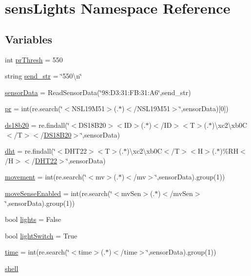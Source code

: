 \hypertarget{namespacesensLights}{}\section{sens\+Lights Namespace Reference}
\label{namespacesensLights}
\subsection*{Variables}
\begin{DoxyCompactItemize}
\item 
int \hyperlink{namespacesensLights_abac1fd1adebeaff35fb495576dbddc5b}{pr\+Thresh} = 550
\item 
string \hyperlink{namespacesensLights_a6e1162048c8d736a8db0351d57a8b139}{send\+\_\+str} = \char`\"{}550\textbackslash{}n\char`\"{}
\item 
\hyperlink{namespacesensLights_a8b0ffad4098c0b49ff9ed83c3e7a279c}{sensor\+Data} = Read\+Sensor\+Data(\char`\"{}98\+:D3\+:31\+:\+F\+B\+:31\+:\+A6\char`\"{},send\+\_\+str)
\item 
\hyperlink{namespacesensLights_a3039fae16cd626cac6686b09a079e832}{pr} = int(re.\+search(\char`\"{}$<$N\+S\+L19\+M51$>$(.$\ast$)$<$/N\+S\+L19\+M51$>$\char`\"{},sensor\+Data)\mbox{[}0\mbox{]})
\item 
\hyperlink{namespacesensLights_ac8aa58ba0e3b1d1e5e43af8368d84bde}{ds18b20} = re.\+findall(\char`\"{}$<$D\+S18\+B20$>$$<$ID$>$(.$\ast$)$<$/ID$>$$<$T$>$(.$\ast$)\textbackslash{}xc2\textbackslash{}xb0C$<$/T$>$$<$/\hyperlink{classDS18B20}{D\+S18\+B20}$>$\char`\"{},sensor\+Data)
\item 
\hyperlink{namespacesensLights_a332e8e9c0d25bdce1ada40499576e97d}{dht} = re.\+findall(\char`\"{}$<$D\+H\+T22$>$$<$T$>$(.$\ast$)\textbackslash{}xc2\textbackslash{}xb0C$<$/T$>$$<$H$>$(.$\ast$)\%RH$<$/H$>$$<$/\hyperlink{classDHT22}{D\+H\+T22}$>$\char`\"{},sensor\+Data)
\item 
\hyperlink{namespacesensLights_a2285eac93c571f3e13b7c75eb076d452}{movement} = int(re.\+search(\char`\"{}$<$mv$>$(.$\ast$)$<$/mv$>$\char`\"{},sensor\+Data).group(1))
\item 
\hyperlink{namespacesensLights_af4085cc84e3f4ffd4e949bc88e9fbd29}{move\+Sense\+Enabled} = int(re.\+search(\char`\"{}$<$mv\+Sen$>$(.$\ast$)$<$/mv\+Sen$>$\char`\"{},sensor\+Data).group(1))
\item 
bool \hyperlink{namespacesensLights_a5c2a6a5aad94452fb16ef2b595eade73}{lights} = False
\item 
bool \hyperlink{namespacesensLights_a8c334ce46f2ca382615e30ca82fa7a2c}{light\+Switch} = True
\item 
\hyperlink{namespacesensLights_a043e829ccb1ca220d4668cdd65be4988}{time} = int(re.\+search(\char`\"{}$<$time$>$(.$\ast$)$<$/time$>$\char`\"{},sensor\+Data).group(1))
\item 
\hyperlink{namespacesensLights_a6af9fcb7c8252a343f039e728ab218b3}{shell}
\end{DoxyCompactItemize}


